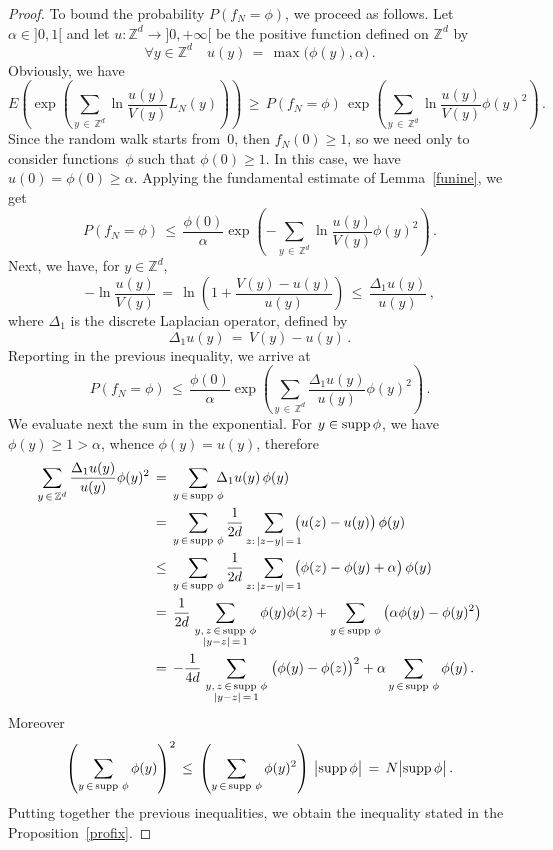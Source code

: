 \documentclass[10pt]{amsart}
\theoremstyle{definition}\newtheorem{defi}[theo]{Definition}\newtheorem{rema}[theo]{Remark}\newtheorem{exam}[theo]{Example}\newtheorem{exem}[theo]{Example}\newtheorem{nota}[theo]{Notation}
\newcommand{\tatop}[2]{\genfrac{}{}{0pt}{1}{#1}{#2}}
\newcommand*\supp{\text{supp\,}}
\newcommand*\Zd {{\mathbb Z^d}}
\let\oldforall\forall
\renewcommand*{\forall}{\mathrel{\oldforall}}
\begin{document}
\begin{proof}
To bound the probability $P(f_N=\phi)$, we proceed as follows. Let $\alpha\in]0,1[$ and let $u:\Zd\to]0,+\infty[$ be the positive function defined on $\Zd$ by
\[
\forall y\in\Zd\quad u(y)\,=\,\max\big(\phi(y),\alpha\big)\,.
\]
Obviously, we have
\[
E\left(\exp\left(\sum_{y\,\in\,\Zd}\ln
\frac{u(y)}{V(y)}L_N(y)\right)
\right)\,\geq\, P(f_N=\phi)\,
\exp\left(\sum_{y\,\in\,\Zd}\ln
\frac{u(y)}{V(y)}\phi(y)^2\right)\,.
\]
Since the random walk starts from~$0$, then $f_N(0)\geq 1$, so we need only to consider functions~$\phi$ such that $\phi(0)\geq 1$. In this case, we have $u(0)=\phi(0)\geq\alpha$. Applying the fundamental estimate of Lemma~\ref{funine}, we get
\[
P(f_N=\phi)\,\leq\,
\frac{\phi(0)}{\alpha}
\exp\left(-\sum_{y\,\in\,\Zd}\ln
\frac{u(y)}{V(y)}\phi(y)^2\right)\,.
\]
Next, we have, for $y\in\Zd$,
\[
-\ln
\frac{u(y)}{V(y)}\,=\,
\ln\left(1+\frac{V(y)-u(y)}{u(y)}
\right)
\,\leq\,\frac{\Delta_1 u(y)}{u(y)}\,,
\]
where $\Delta_1$ is the discrete Laplacian operator, defined by
\[
\Delta_1u(y)\,=\,V(y)-u(y)\,.
\]
Reporting in the previous inequality, we arrive at
\[
P(f_N=\phi)\,\leq\,
\frac{\phi(0)}{\alpha}
\exp\left(\sum_{y\,\in\,\Zd}
\frac{\Delta_1u(y)}{u(y)}\phi(y)^2\right)\,.
\]
We evaluate next the sum in the exponential. For $y\in\supp\phi$, we have $\phi(y)\geq 1>\alpha$, whence $\phi(y)=u(y)$, therefore
\begin{align*}
\sum_{y\,\in\,\Zd}
\frac{\Delta_1u(y)}{u(y)}\phi(y)^2\,&=\,
\sum_{y\,\in\,\supp\,\phi}\kern-7pt {\Delta_1u(y)}\,\phi(y)\\
\,&=\,
\sum_{y\,\in\,\supp\,\phi}
\frac{1}{2d}
\sum_{z:\,|z-y|\,=\,1}\kern-7pt
\big(u(z)-u(y)\big)
\,\phi(y)\\
\,&\leq \,
\sum_{y\,\in\,\supp\,\phi}
\frac{1}{2d}
\sum_{z:\,|z-y|\,=\,1}\kern-7pt
\big(
\phi(z)-\phi(y)+\alpha\big)
\,\phi(y)\\
\,&= \,
\frac{1}{2d}
\sum_{\tatop{y,\,z\,\in\,\supp\,\phi}{|y-z|\,=\,1}}
\phi(y)\phi(z)+
\sum_{y\,\in\,\supp\,\phi}\big(\alpha\phi(y)-\phi(y)^2\big)\\
\,&= \, -\frac{1}{4d}
\sum_{\tatop{y,\,z\,\in\,\supp\,\phi}{|y-z|\,=\,1}}
\big(\phi(y)-\phi(z)\big)^2+
\alpha\sum_{y\,\in\,\supp\,\phi}\phi(y)\,.
\end{align*}
Moreover
\[
\left(\sum_{y\,\in\,\supp\,\phi}\phi(y)\right)^2\,\leq\,
\left(\sum_{y\,\in\,\supp\,\phi}\phi(y)^2\right)
\,\big|\supp\phi\big|
\,=\, N\big|\supp\phi\big|
\,.
\]
Putting together the previous inequalities, we obtain the inequality stated in the Proposition~\ref{profix}.
\end{proof}
\end{document}
